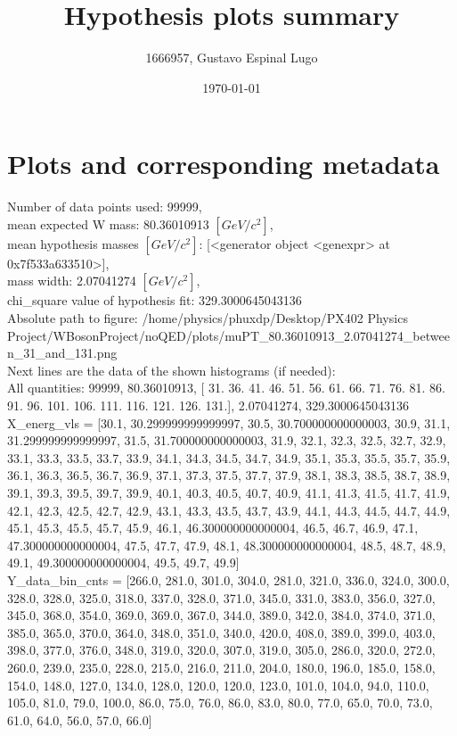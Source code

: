 \documentclass[12pt]{article}
\begin{document}
	\title{Hypothesis plots summary} %
	\author{1666957, Gustavo Espinal Lugo}
	\date{\today} %

	\maketitle
	
	\section*{Plots and corresponding metadata}
	Number of data points used: 99999,\\
mean expected W mass: 80.36010913 $[GeV/c^{2}]$,\\
mean hypothesis masses $[GeV/c^{2}]$: [<generator object <genexpr> at 0x7f533a633510>],\\
mass width: 2.07041274 $[GeV/c^{2}]$,\\
chi\_square value of hypothesis fit: 329.3000645043136\\
	Absolute path to figure: /home/physics/phuxdp/Desktop/PX402 Physics Project/WBosonProject/noQED/plots/muPT\_80.36010913\_2.07041274\_between\_31\_and\_131.png\\
	Next lines are the data of the shown histograms (if needed): \\
	All quantities: 	99999, 80.36010913, [ 31.  36.  41.  46.  51.  56.  61.  66.  71.  76.  81.  86.  91.  96.
 101. 106. 111. 116. 121. 126. 131.], 2.07041274, 329.3000645043136\\
	X\_energ\_vls = [30.1, 30.299999999999997, 30.5, 30.700000000000003, 30.9, 31.1, 31.299999999999997, 31.5, 31.700000000000003, 31.9, 32.1, 32.3, 32.5, 32.7, 32.9, 33.1, 33.3, 33.5, 33.7, 33.9, 34.1, 34.3, 34.5, 34.7, 34.9, 35.1, 35.3, 35.5, 35.7, 35.9, 36.1, 36.3, 36.5, 36.7, 36.9, 37.1, 37.3, 37.5, 37.7, 37.9, 38.1, 38.3, 38.5, 38.7, 38.9, 39.1, 39.3, 39.5, 39.7, 39.9, 40.1, 40.3, 40.5, 40.7, 40.9, 41.1, 41.3, 41.5, 41.7, 41.9, 42.1, 42.3, 42.5, 42.7, 42.9, 43.1, 43.3, 43.5, 43.7, 43.9, 44.1, 44.3, 44.5, 44.7, 44.9, 45.1, 45.3, 45.5, 45.7, 45.9, 46.1, 46.300000000000004, 46.5, 46.7, 46.9, 47.1, 47.300000000000004, 47.5, 47.7, 47.9, 48.1, 48.300000000000004, 48.5, 48.7, 48.9, 49.1, 49.300000000000004, 49.5, 49.7, 49.9]\\
	Y\_data\_bin\_cnts = [266.0, 281.0, 301.0, 304.0, 281.0, 321.0, 336.0, 324.0, 300.0, 328.0, 328.0, 325.0, 318.0, 337.0, 328.0, 371.0, 345.0, 331.0, 383.0, 356.0, 327.0, 345.0, 368.0, 354.0, 369.0, 369.0, 367.0, 344.0, 389.0, 342.0, 384.0, 374.0, 371.0, 385.0, 365.0, 370.0, 364.0, 348.0, 351.0, 340.0, 420.0, 408.0, 389.0, 399.0, 403.0, 398.0, 377.0, 376.0, 348.0, 319.0, 320.0, 307.0, 319.0, 305.0, 286.0, 320.0, 272.0, 260.0, 239.0, 235.0, 228.0, 215.0, 216.0, 211.0, 204.0, 180.0, 196.0, 185.0, 158.0, 154.0, 148.0, 127.0, 134.0, 128.0, 120.0, 120.0, 123.0, 101.0, 104.0, 94.0, 110.0, 105.0, 81.0, 79.0, 100.0, 86.0, 75.0, 76.0, 86.0, 83.0, 80.0, 77.0, 65.0, 70.0, 73.0, 61.0, 64.0, 56.0, 57.0, 66.0]\\
\end{document}
